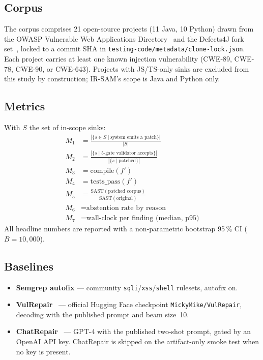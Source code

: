 \documentclass[conference]{IEEEtran}
\newcommand{\IRSAM}{\textsc{IR-SAM}}
\begin{document}
\subsection{Corpus}
The corpus comprises 21 open-source projects (11 Java, 10 Python)
drawn from the OWASP Vulnerable Web Applications
Directory~\cite{owasp_vwad_2024} and the Defects4J fork
set~\cite{just_defects4j_2014}, locked to a commit SHA in
\texttt{testing-code/metadata/clone-lock.json}. Each project carries
at least one known injection vulnerability (CWE-89, CWE-78, CWE-90,
or CWE-643). Projects with JS/TS-only sinks are excluded from this
study by construction; \IRSAM{}'s scope is Java and Python only.

\subsection{Metrics}
With $S$ the set of in-scope sinks:
\begin{align*}
M_1 &= \frac{|\{s \in S \mid \text{system emits a patch}\}|}{|S|} \\
M_2 &= \frac{|\{s \mid \text{5-gate validator accepts}\}|}{|\{s \mid \text{patched}\}|} \\
M_3 &= \mathrm{compile}(f')                                          \\
M_4 &= \mathrm{tests\_pass}(f')                                       \\
M_5 &= \frac{\mathrm{SAST}(\text{patched corpus})}{\mathrm{SAST}(\text{original})} \\
M_6 &= \text{abstention rate by reason}                              \\
M_7 &= \text{wall-clock per finding (median, p95)}
\end{align*}
All headline numbers are reported with a non-parametric bootstrap
95\,\% CI ($B=10{,}000$).

\subsection{Baselines}
\begin{itemize}[leftmargin=*]
\item \textbf{Semgrep autofix} --- community
  \texttt{sqli}/\texttt{xss}/\texttt{shell} rulesets, autofix on.
\item \textbf{VulRepair}~\cite{li_vulrepair_2022} --- official
  Hugging Face checkpoint \texttt{MickyMike/VulRepair}, decoding
  with the published prompt and beam size~10.
\item \textbf{ChatRepair}~\cite{xia_chatrepair_2023} ---
  GPT-4 with the published two-shot prompt, gated by an OpenAI API
  key. ChatRepair is skipped on the artifact-only smoke test when
  no key is present.
\end{itemize}
\end{document}
